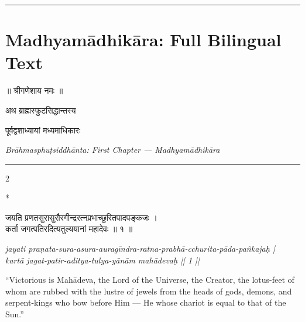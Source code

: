 \documentclass[11pt,a4paper]{article}
\newcommand{\longline}{\noindent\rule{\textwidth}{0.4pt}}
\newcommand{\dev}[1]{{\devanagarifont #1}}
\theoremstyle{definition}
\begin{document}
\longline

\newpage
\section{Madhyam\=adhik\=ara: Full Bilingual Text}
\label{sec:sanskrit}

\begin{center}
{\Large\dev{॥ श्रीगणेशाय नमः ॥}}

\vspace{0.5cm}
{\Large\dev{अथ ब्राह्मस्फुटसिद्धान्तस्य}}

\vspace{0.3cm}
{\large\dev{पूर्वद्वशाध्यायां मध्यमाधिकारः}}

\vspace{0.5cm}
\textit{Br\=ahmasphu\d{t}siddh\=anta: First Chapter --- Madhyam\=adhik\=ara}
\end{center}

\vspace{0.8cm}

\noindent\rule{\textwidth}{1pt}

\vspace{0.5cm}

\begin{paracol}{2}

\switchcolumn[0]*\noindent
\begin{tcolorbox}[colback=sktbg,colframe=vertrule,boxrule=0.5pt,arc=3pt,title={\small\bfseries Verse 1}]
\dev{जयति प्रणतसुरासुरौरगीन्द्ररत्नप्रभाच्छुरितपादपङ्कजः ।\\
कर्ता जगत्पतिरदित्यतुल्ययानां महादेवः ॥ १ ॥}
\end{tcolorbox}

\switchcolumn\noindent
\begin{tcolorbox}[colback=transbg,colframe=vertrule!60,boxrule=0.5pt,arc=3pt,title={\small\bfseries Translation 1}]
\textit{jayati pra\d{n}ata-sura-asura-aurag\={i}ndra-ratna-prabh\=a-cchurita-p\=ada-pa\~nkaja\d{h} |\\
kart\=a jagat-patir-aditya-tulya-y\=an\=am mah\=adeva\d{h} || 1 ||}

``Victorious is Mah\=adeva, the Lord of the Universe, the Creator, the lotus-feet of whom are rubbed with the lustre of jewels from the heads of gods, demons, and serpent-kings who bow before Him --- He whose chariot is equal to that of the Sun.''
\end{tcolorbox}

\end{paracol}
\end{document}
